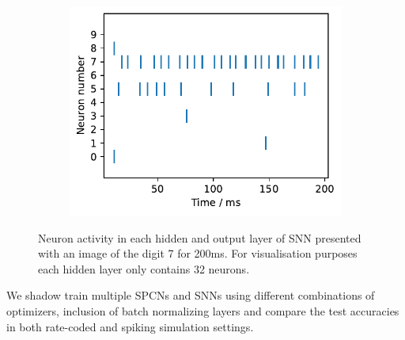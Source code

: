 \documentclass[a4paper,11pt]{article} %
\begin{document}
\begin{figure}[ht]
\begin{subfigure}[t]{0.32\columnwidth}
    \includegraphics[width=\linewidth]{graphics/spikes_2.pdf}  
  \end{subfigure}
  \caption{Neuron activity in each hidden and output layer of SNN presented with an image of the digit 7 for 200ms. For visualisation purposes each hidden layer only contains 32 neurons.}
\end{figure}
We shadow train multiple SPCNs and SNNs using different combinations of optimizers, inclusion of batch normalizing layers and compare the test accuracies in both rate-coded and spiking simulation settings.
\end{document}
